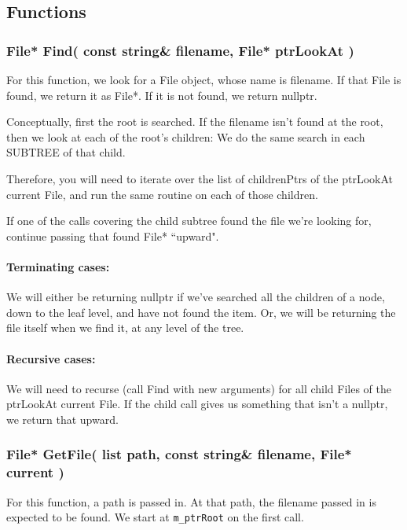 \documentclass[a4paper,12pt,oneside]{book}
\begin{document}
\subsection{Functions}

\subsubsection{ File* Find( const string\& filename, File* ptrLookAt ) }

For this function, we look for a File object, whose name is filename.
If that File is found, we return it as File*. If it is not found, we return nullptr.

Conceptually, first the root is searched. If the filename isn't found at
the root, then we look at each of the root's children: We do the same search in each SUBTREE of that child.

Therefore, you will need to iterate over the list of childrenPtrs of the
ptrLookAt current File, and run the same routine on each of those children.

If one of the calls covering the child subtree found the file we're looking
for, continue passing that found File* ``upward".

\paragraph{Terminating cases:}

We will either be returning nullptr if we've searched all the children of a node, down to the leaf level, and have not found the item. Or, we will be returning the file itself when we find it, at any level of the tree.

\paragraph{Recursive cases:}

We will need to recurse (call Find with new arguments) for all child Files of the ptrLookAt current File. If the child call gives us something that isn't a nullptr, we return that upward.


\subsubsection{ File* GetFile( list path, const string\& filename, File* current ) }

For this function, a path is passed in. At that path, the filename passed
in is expected to be found. We start at \texttt{m\_ptrRoot} on the first call.
\end{document}
